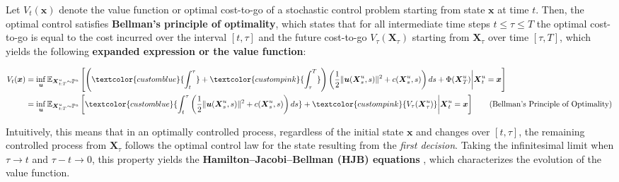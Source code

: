 \documentclass{article}
\newcommand{\boldtext}[1]{\textbf{\textcolor{MyGreen}{#1}}}
\newcommand{\bluetext}[1]{\textcolor{customblue}{#1}}
\newcommand{\pinktext}[1]{\textcolor{custompink}{#1}}
\begin{document}
\begin{definition}\label{def:bellman-principle}
    Let $V_t(\boldsymbol{x})$ denote the value function or optimal cost-to-go of a stochastic control problem starting from state $\boldsymbol{x}$ at time $t$. Then, the optimal control satisfies \textbf{Bellman’s principle of optimality},  which states that for all intermediate time steps $t\leq \tau \leq T$ the optimal cost-to-go is equal to the cost incurred over the interval $[t,\tau]$ and the future cost-to-go $V_\tau(\boldsymbol{X}_\tau)$ starting from $\boldsymbol{X}_\tau$ over time $[\tau,T]$, which yields the following \textbf{expanded expression or the value function}:
    \begin{small}
    \begin{align}
        V_t(\boldsymbol{x})&=\inf_{\boldsymbol{u}}\mathbb{E}_{\boldsymbol{X}^u_{t:T}\sim \mathbb{P}^u}\left[\left(\bluetext{\int_t^{\tau}}+\pinktext{\int_\tau^T}\right)\left(\frac{1}{2}\|\boldsymbol{u}(\boldsymbol{X}^u_s,s)\|^2+c(\boldsymbol{X}^u_s,s)\right)ds+\Phi(\boldsymbol{X}^u_T)\bigg|\boldsymbol{X}^u_t=\boldsymbol{x}\right]\nonumber\\
        &= \inf_{\boldsymbol{u}}\mathbb{E}_{\boldsymbol{X}^u_{t:T}\sim \mathbb{P}^u}\left[\bluetext{\int_t^{\tau}\left(\frac{1}{2}\|\boldsymbol{u}(\boldsymbol{X}^u_s,s)\|^2+c(\boldsymbol{X}^u_s,s)\right)ds}+\pinktext{V_{\tau}(\boldsymbol{X}^u_{\tau})}\bigg|\boldsymbol{X}^u_t=\boldsymbol{x}\right]\tag{Bellman's Principle of Optimality}\label{eq:bellman-principle}
    \end{align}
    \end{small}
\end{definition}

Intuitively, this means that in an optimally controlled process, regardless of the initial state $\boldsymbol{x}$ and changes over $[t,\tau]$, the remaining controlled process from $\boldsymbol{X}_\tau$ follows the optimal control law for the state resulting from the \textit{first decision}. Taking the infinitesimal limit when $\tau\to t$ and $\tau-t\to 0$, this property yields the \boldtext{Hamilton–Jacobi–Bellman (HJB) equations} \citep{bardi1997optimal}, which characterizes the evolution of the value function.
\end{document}
